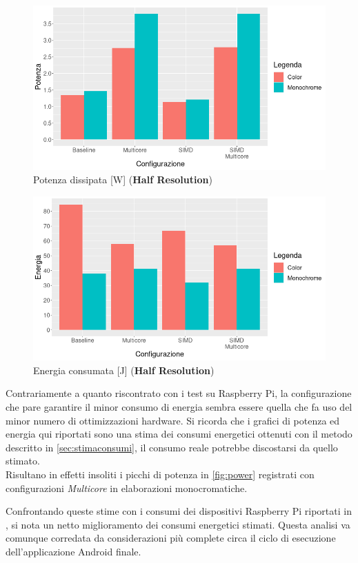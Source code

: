 \begin{figure}[h!]
    \begin{center}
        \includegraphics[scale=0.45]{img/power.png}
        \caption{Potenza dissipata [W] (\textbf{Half Resolution})}
        \label{fig:power}
    \end{center}
\end{figure}

\begin{figure}[h!]
    \begin{center}
        \includegraphics[scale=0.45]{img/energy.png}
        \caption{Energia consumata [J] (\textbf{Half Resolution})}
    \end{center}
\end{figure}

Contrariamente a quanto riscontrato con i test su Raspberry Pi, la configurazione che pare garantire il minor consumo di energia
sembra essere quella che fa uso del minor numero di ottimizzazioni hardware. Si ricorda che i grafici di potenza ed energia
qui riportati sono una stima dei consumi energetici ottenuti con il metodo descritto in \autoref{sec:stimaconsumi}, 
il consumo reale potrebbe discostarsi da quello stimato.\\
Risultano in effetti insoliti i picchi di potenza in \autoref{fig:power} registrati con configurazioni \textit{Multicore} in elaborazioni monocromatiche.

Confrontando queste stime con i consumi dei dispositivi Raspberry Pi riportati in \cite{app11157027}, si nota un netto miglioramento
dei consumi energetici stimati. Questa analisi va comunque corredata da considerazioni più complete circa il ciclo di esecuzione
dell'applicazione Android finale.